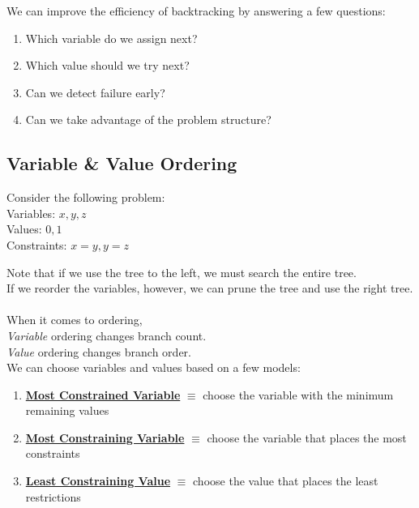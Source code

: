\documentclass[../../lecture_notes.tex]{subfiles}
\begin{document}
\noindent We can improve the efficiency of backtracking by answering a few questions:
\begin{enumerate} [itemsep=0mm]
	\item Which variable do we assign next?
	\item Which value should we try next?
	\item Can we detect failure early?
	\item Can we take advantage of the problem structure?
\end{enumerate}

\subsection*{Variable \& Value Ordering}
\noindent Consider the following problem:\\
	\indent Variables: ${x, y, z}$\\
	\indent Values: ${0, 1}$\\
	\indent Constraints: ${x=y, y=z}$\\
\begin{center}  \end{center}

\noindent Note that if we use the tree to the left, we must search the entire tree.\\
If we reorder the variables, however, we can prune the tree and use the right tree.\\
\\
When it comes to ordering,\\
	\indent \textit{Variable} ordering changes branch count.\\
	\indent \textit{Value} ordering changes branch order.\\
We can choose variables and values based on a few models:
\begin{enumerate} [itemsep=0mm]
	\item \textbf{\underline{Most Constrained Variable}}
		 $\equiv$ choose the variable with the minimum remaining values
	\item \textbf{\underline{Most Constraining Variable}} 
		$\equiv$ choose the variable that places the most constraints
	\item \textbf{\underline{Least Constraining Value}}
		$\equiv$ choose the value that places the least restrictions
\end{enumerate}
\end{document}
